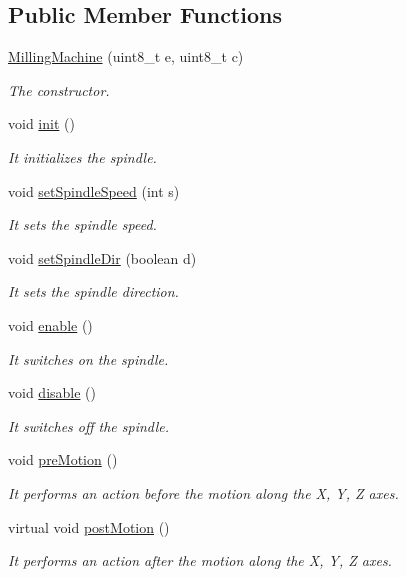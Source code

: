 \subsection*{Public Member Functions}
\begin{DoxyCompactItemize}
\item 
\hyperlink{class_milling_machine_afdeaae37d959bd4c9de40195a2650aa4}{Milling\+Machine} (uint8\+\_\+t e, uint8\+\_\+t c)
\begin{DoxyCompactList}\small\item\em The constructor. \end{DoxyCompactList}\item 
void \hyperlink{class_milling_machine_ad8b30fc42959606e9773e5ae7e31bac7}{init} ()
\begin{DoxyCompactList}\small\item\em It initializes the spindle. \end{DoxyCompactList}\item 
void \hyperlink{class_milling_machine_a4c41fa0e6f882281ffc3b67a1771da57}{set\+Spindle\+Speed} (int s)
\begin{DoxyCompactList}\small\item\em It sets the spindle speed. \end{DoxyCompactList}\item 
void \hyperlink{class_milling_machine_a5c49cbbcd45406c9537ccac8f7c22c39}{set\+Spindle\+Dir} (boolean d)
\begin{DoxyCompactList}\small\item\em It sets the spindle direction. \end{DoxyCompactList}\item 
void \hyperlink{class_milling_machine_af965377184ed3bc3ed56763cd652d10f}{enable} ()
\begin{DoxyCompactList}\small\item\em It switches on the spindle. \end{DoxyCompactList}\item 
void \hyperlink{class_milling_machine_a6e1eb0b5f72e31ad0505b5f61613831d}{disable} ()
\begin{DoxyCompactList}\small\item\em It switches off the spindle. \end{DoxyCompactList}\item 
void \hyperlink{class_milling_machine_a3987303895b4d73ed7bc9346cbdf163f}{pre\+Motion} ()
\begin{DoxyCompactList}\small\item\em It performs an action before the motion along the X, Y, Z axes. \end{DoxyCompactList}\item 
virtual void \hyperlink{class_milling_machine_a1939dadb13a2552867eff5ed4ede94ac}{post\+Motion} ()
\begin{DoxyCompactList}\small\item\em It performs an action after the motion along the X, Y, Z axes. \end{DoxyCompactList}\end{DoxyCompactItemize}
